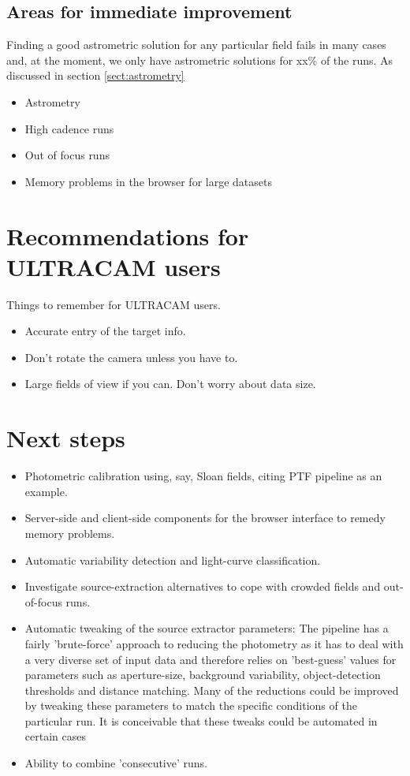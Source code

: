 \subsection{Areas for immediate improvement}
Finding a good astrometric solution for any particular field fails in many cases and, at the moment, we only have astrometric solutions for xx\% of the runs. As discussed in section \ref{sect:astrometry}

\begin{itemize}
  \item Astrometry
  \item High cadence runs
  \item Out of focus runs
  \item Memory problems in the browser for large datasets 
\end{itemize}

\section{Recommendations for ULTRACAM users}

Things to remember for ULTRACAM users. 
\begin{itemize}
	\item Accurate entry of the target info.
	\item Don't rotate the camera unless you have to.
	\item Large fields of view if you can. Don't worry about data size. 
\end{itemize} 

\section{Next steps}
\begin{itemize}
	\item Photometric calibration using, say, Sloan fields, citing PTF pipeline as an example.
	\item Server-side and client-side components for the browser interface to remedy memory problems.
	\item Automatic variability detection and light-curve classification. 
	\item Investigate source-extraction alternatives to cope with crowded fields and out-of-focus runs.
	\item Automatic tweaking of the source extractor parameters: The pipeline has a fairly 'brute-force' approach to reducing the photometry as it has to deal with a very diverse set of input data and therefore relies on 'best-guess' values for parameters such as aperture-size, background variability, object-detection thresholds and distance matching. Many of the reductions could be improved by tweaking these parameters to match the specific conditions of the particular run. It is conceivable that these tweaks could be automated in certain cases
	\item Ability to combine 'consecutive' runs. 
\end{itemize} 
 

